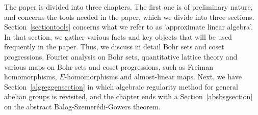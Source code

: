 \documentclass[a4paper,11pt]{article}
\numberwithin{theorem}{section}
\theoremstyle{definition}
\begin{document}
The paper is divided into three chapters. The first one is of preliminary nature, and concerns the tools needed in the paper, which we divide into three sections. Section~\ref{sectiontools} concerns what we refer to as 'approximate linear algebra'. In that section, we gather various facts and key objects that will be used frequently in the paper. Thus, we discuss in detail Bohr sets and coset progressions, Fourier analysis on Bohr sets, quantitative lattice theory and various maps on Bohr sets and coset progressions, such as Freiman homomorphisms, $E$-homomorphisms and almost-linear maps. Next, we have Section~\ref{algreggensection} in which algebraic regularity method for general abelian groups is revisited, and the chapter ends with a Section~\ref{absbsgsection} on the abstract Balog-Szemer\'edi-Gowers theorem.\\
\end{document}
